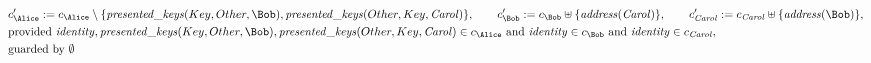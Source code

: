 \begin{align*}
&
c'_
{
\Alice
}
 := 
c_
{
\Alice
}
 \setminus 
\{
\mathit{\detokenize{
presented_keys
}}
(
Key
,
Other
,
\Bob
)
,
\mathit{\detokenize{
presented_keys
}}
(
Other
,
Key
,
\mathit{Carol}
)
\}
, \qquad 
c'_
{
\Bob
}
 := 
c_
{
\Bob
}
 \uplus 
\{
\mathit{\detokenize{
address
}}
(
\mathit{Carol}
)
\}
, \qquad 
c'_
{
\mathit{Carol}
}
 := 
c_
{
\mathit{Carol}
}
 \uplus 
\{
\mathit{\detokenize{
address
}}
(
\Bob
)
\}
,\\
&
\text{provided } 
\mathit{\detokenize{
identity
}}
,
\mathit{\detokenize{
presented_keys
}}
(
Key
,
Other
,
\Bob
)
,
\mathit{\detokenize{
presented_keys
}}
(
Other
,
Key
,
\mathit{Carol}
)
 \in c_
{
\Alice
}
 \text{ and } 
\mathit{\detokenize{
identity
}}
 \in c_
{
\Bob
}
 \text{ and } 
\mathit{\detokenize{
identity
}}
 \in c_
{
\mathit{Carol}
}
,\\
&
\text{guarded by } \emptyset
\end{align*}
